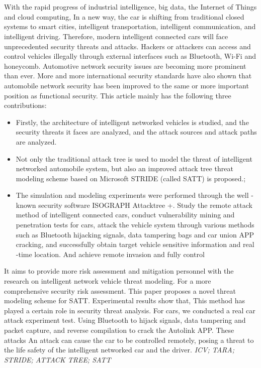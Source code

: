 \newpage
\vspace{-1cm}
\chapter*{\xiaosan {}}
\vspace{-0.5cm}
\hspace{-0.5cm}
With the rapid progress of industrial intelligence, big data, the Internet of Things and cloud computing,
In a new way, the car is shifting from traditional closed systems to smart cities, intelligent transportation, intelligent communication, and intelligent driving. Therefore, modern intelligent connected cars will face unprecedented security threats and attacks. Hackers or attackers can access and control vehicles illegally through external interfaces such as Bluetooth, Wi-Fi and honeycomb. Automotive network security issues are becoming more prominent than ever. More and more international security standards have also shown that automobile network security has been improved to the same or more important position as functional security. This article mainly has the following three contributions:
\begin{itemize}
    \item Firstly, the architecture of intelligent networked vehicles is studied, and the security threats it faces are analyzed, and the attack sources and attack paths are analyzed.
    \item Not only the traditional attack tree is used to model the threat of intelligent networked automobile system, but also an improved attack tree threat modeling scheme based on Microsoft STRIDE (called SATT) is proposed.;
    \item The simulation and modeling experiments were performed through the well -known security software ISOGRAPH Attacktree +. Study the remote attack method of intelligent connected cars, conduct vulnerability mining and penetration tests for cars, attack the vehicle system through various methods such as Bluetooth hijacking signals, data tampering bags and car union APP cracking, and successfully obtain target vehicle sensitive information and real -time location.  And achieve remote invasion and fully control
  \end{itemize}
  It aims to provide more risk assessment and mitigation personnel with the research on intelligent network vehicle threat modeling.
  For a more comprehensive security risk assessment. This paper proposes a novel threat modeling scheme for SATT. Experimental results show that,
  This method has played a certain role in security threat analysis. For cars, we conducted a real car attack experiment
  test. Using Bluetooth to hijack signals, data tampering and packet capture, and reverse compilation to crack the Autolink APP. These attacks
  An attack can cause the car to be controlled remotely, posing a threat to the life safety of the intelligent networked car and the driver.
  \newline
{}\textit{ICV; TARA; STRIDE; ATTACK TREE; SATT}